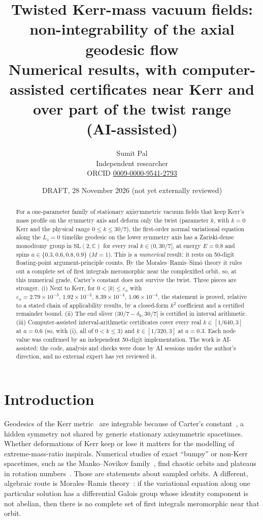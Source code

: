 \documentclass[11pt,a4paper]{article}
\title{Twisted Kerr-mass vacuum fields: non-integrability of the axial geodesic flow\\[6pt]
\large Numerical results, with computer-assisted certificates near Kerr and over part of the twist range\\
(AI-assisted)}
\author{Sumit Pal\\ Independent researcher \\ ORCID \href{https://orcid.org/0009-0000-9541-2793}{0009-0000-9541-2793}}
\date{DRAFT, 28 November 2026 (not yet externally reviewed)}
\newcommand{\SL}{\mathrm{SL}(2,\mathbb{C})}
\begin{document}
\maketitle

\begin{abstract}
For a one-parameter family of stationary axisymmetric vacuum fields that keep Kerr's mass profile on the
symmetry axis and deform only the twist (parameter $k$, with $k=0$ Kerr and the physical range $0\le k\le 30/7$),
the first-order normal variational equation along the $L_z=0$ timelike geodesic on the lower symmetry axis has a
Zariski-dense monodromy group in $\SL$ for every real $k\in(0,30/7]$, at energy $E=0.8$ and spins
$a\in\{0.3,0.6,0.8,0.9\}$ ($M=1$). This is a \emph{numerical} result: it rests on 50-digit floating-point
argument-principle counts. By the Morales--Ramis--Sim\'o theory it rules out a complete set of first integrals
meromorphic near the complexified orbit, so, at this numerical grade, Carter's constant does not survive the twist.
Three pieces are stronger. (i) Next to Kerr, for $0<|k|\le\varepsilon_a$ with
$\varepsilon_a = 2.79\times10^{-3},\,1.92\times10^{-3},\,8.39\times10^{-4},\,1.06\times10^{-4}$, the statement is
proved, relative to a stated chain of applicability results, by a closed-form $k^2$ coefficient and a certified
remainder bound. (ii) The end sliver $(30/7-\delta_0,30/7]$ is certified in interval arithmetic.
(iii) Computer-assisted interval-arithmetic certificates cover every real $k\in[1/640,3]$ at $a=0.6$ (so, with (i),
all of $0<k\le3$) and $k\in[1/320,3]$ at $a=0.3$. Each node value was confirmed by an independent
50-digit implementation. The work is AI-assisted: the code, analysis and checks were done by AI sessions under
the author's direction, and no external expert has yet reviewed it.
\end{abstract}

\section{Introduction}
Geodesics of the Kerr metric~\cite{Kerr1963} are integrable because of Carter's constant~\cite{Carter1968}, a hidden symmetry not shared by
generic stationary axisymmetric spacetimes. Whether deformations of Kerr keep or lose it matters for the modelling
of extreme-mass-ratio inspirals. Numerical studies of exact ``bumpy'' or non-Kerr spacetimes, such as the Manko--Novikov family~\cite{MankoNovikov1992}, find chaotic orbits and
plateaus in rotation numbers~\cite{GairLiMandel2008,LukesGerakopoulos2010}. Those are statements about sampled
orbits. A different, algebraic route is Morales--Ramis theory~\cite{MoralesRuiz1999,MoralesRamis2001,MRS2007}: if
the variational equation along one particular solution has a differential Galois group whose identity component is
not abelian, then there is no complete set of first integrals meromorphic near that orbit.
\end{document}
